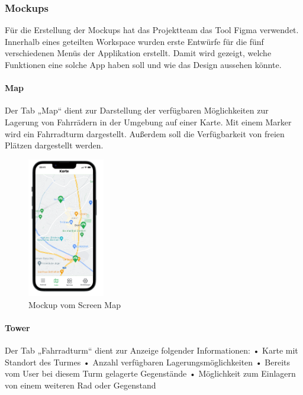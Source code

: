 \subsubsection{Mockups}
Für die Erstellung der Mockups hat das Projektteam das Tool Figma verwendet. Innerhalb eines geteilten Workspace wurden erste Entwürfe für die fünf verschiedenen Menüs der Applikation erstellt. Damit wird gezeigt, welche Funktionen eine solche App haben soll und wie das Design aussehen könnte.\\

\paragraph{Map}Der Tab „Map“ dient zur Darstellung der verfügbaren Möglichkeiten zur Lagerung von Fahrrädern in der Umgebung auf einer Karte. Mit einem Marker wird ein Fahrradturm dargestellt. Außerdem soll die Verfügbarkeit von freien Plätzen dargestellt werden.\\

\begin{figure}[ht]
  \centering
  \includegraphics[width=0.3\textwidth]{images/app_mock_map}
  \caption{Mockup vom Screen Map}
  \label{fig:screenmap}
\end{figure}

\paragraph{Tower}Der Tab „Fahrradturm“ dient zur Anzeige folgender Informationen:
•	Karte mit Standort des Turmes
•	Anzahl verfügbaren Lagerungsmöglichkeiten
•	Bereits vom User bei diesem Turm gelagerte Gegenstände 
•	Möglichkeit zum Einlagern von einem weiteren Rad oder Gegenstand
 \\

